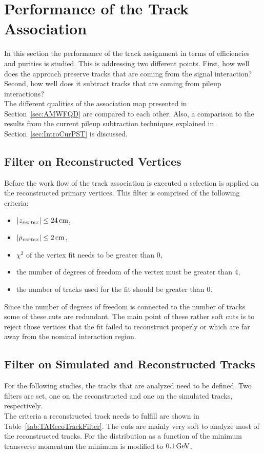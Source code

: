 \chapter{Performance of the Track Association \label{sec:TrackAss} }

In this section the performance of the track assignment in terms of efficiencies and purities is studied. This is addressing two different points. First, how well does the approach preserve tracks that are coming from the signal interaction? Second, how well does it subtract tracks that are coming from pileup interactions?\\
The different qualities of the association map presented in Section~\ref{sec:AMWFQD} are compared to each other. Also, a comparison to the results from the current pileup subtraction techniques explained in Section~\ref{sec:IntroCurPST} is discussed.

\section{Filter on Reconstructed Vertices \label{sec:TAFVC}}

Before the work flow of the track association is executed a selection is applied on the reconstructed primary vertices. This filter is comprised of the following criteria:
\begin{itemize}
    \item $ \left| z_{vertex} \right| \leq 24\,\text{cm}$,
    \item $ \left| \rho_{vertex} \right| \leq 2\,\text{cm}$,
    \item $\chi^{2}$ of the vertex fit needs to be greater than 0,
    \item the number of degrees of freedom of the vertex must be greater than 4,
    \item the number of tracks used for the fit should be greater than 0.
\end{itemize}
Since the number of degrees of freedom is connected to the number of tracks some of these cuts are redundant. The main point of these rather soft cuts is to reject those vertices that the fit failed to reconstruct properly or which are far away from the nominal interaction region.

\section{Filter on Simulated and Reconstructed Tracks \label{sec:TAFSRT}}

For the following studies, the tracks that are analyzed need to be defined. Two filters are set, one on the reconstructed and one on the simulated tracks, respectively. \\
The criteria a reconstructed track needs to fulfill are shown in Table~\ref{tab:TARecoTrackFilter}. The cuts are mainly very soft to analyze most of the reconstructed tracks. For the distribution as a function of the minimum transverse momentum the minimum \pt{} is modified to $0.1\,\text{Ge\hspace{-.08em}V}$.

